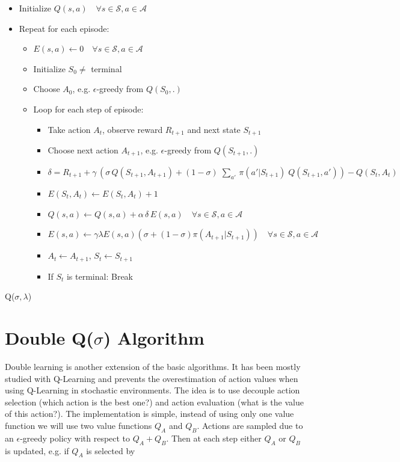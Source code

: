 \documentclass{article} %
\begin{document}
\begin{pseudocode}
\begin{itemize}
  \item[] Initialize $Q(s, a) \quad \forall s \in \mathcal{S}, a \in \mathcal{A}$ 
  \item[] Repeat for each episode:
  \begin{itemize}
  \item[] $E(s, a) \leftarrow 0 \quad \forall s \in \mathcal{S}, a \in \mathcal{A}$
  \item[] Initialize $S_0 \neq$ terminal
  \item[] Choose $A_0$, e.g. $\epsilon$-greedy from $Q(S_0, .)$
  \item[] Loop for each step of episode:
  \begin{itemize}
    \item[] Take action $A_t$, observe reward $R_{t+1}$ and next state $S_{t+1}$
    \item[] Choose next action $A_{t+1}$, e.g. $\epsilon$-greedy from $Q(S_{t+1}, .)$
    \item[] $\delta = R_{t+1} + \gamma \, (\sigma \, Q(S_{t+1}, A_{t+1}) + (1- \sigma) \; \sum_{a'} \,\pi(a'|S_{t+1}) \; Q(S_{t+1}, a')) - Q(S_{t}, A_t) $
    \item[] $E(S_t, A_t) \leftarrow E(S_t, A_t) + 1$
    \item[] $Q(s, a) \leftarrow Q(s, a) + \alpha \, \delta \, E(s, a) \quad \forall s \in \mathcal{S}, a \in \mathcal{A}$
    \item[] $E(s, a) \leftarrow \gamma \lambda E(s, a) ( \sigma + (1 - \sigma) \pi(A_{t+1} | S_{t+1}) ) \quad \forall s \in \mathcal{S}, a \in \mathcal{A}$
    \item[] $A_t \leftarrow A_{t+1}$, $S_t \leftarrow S_{t+1}$
    \item[] If $S_t$ is terminal: Break
  \end{itemize}
\end{itemize}
\end{itemize}
\caption{Q($\sigma, \lambda$)}
\label{algorithm1}
\end{pseudocode}

\section{Double Q($\sigma$) Algorithm}

Double learning is another extension of the basic algorithms. It has been mostly studied with Q-Learning \cite{hasselt2010} and prevents the overestimation of action values when using Q-Learning in stochastic environments. The idea is to use decouple action selection (which action is the best one?) and action evaluation (what is the value of this action?). The implementation is simple, instead of using only one value function we will use two value functions $Q_A$ and $Q_B$. Actions are sampled due to an $\epsilon$-greedy policy with respect to $Q_A + Q_B$. Then at each step either $Q_A$ or $Q_B$ is updated, e.g. if $Q_A$ is selected by
\end{document}
